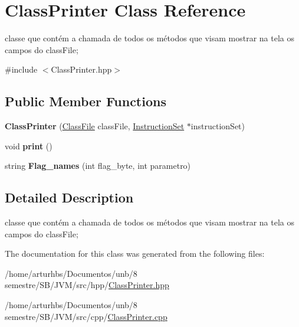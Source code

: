 \hypertarget{classClassPrinter}{}\section{Class\+Printer Class Reference}
\label{classClassPrinter}


classe que contém a chamada de todos os métodos que visam mostrar na tela os campos do class\+File;  




{\ttfamily \#include $<$Class\+Printer.\+hpp$>$}

\subsection*{Public Member Functions}
\begin{DoxyCompactItemize}
\item 
{\bfseries Class\+Printer} (\hyperlink{classClassFile}{Class\+File} class\+File, \hyperlink{classInstructionSet}{Instruction\+Set} $\ast$instruction\+Set)\hypertarget{classClassPrinter_ae6f4be2efe9a9e3e6056304330dc7430}{}\label{classClassPrinter_ae6f4be2efe9a9e3e6056304330dc7430}

\item 
void {\bfseries print} ()\hypertarget{classClassPrinter_a8871ec5a8e14410486d1aa1fa93323eb}{}\label{classClassPrinter_a8871ec5a8e14410486d1aa1fa93323eb}

\item 
string {\bfseries Flag\+\_\+names} (int flag\+\_\+byte, int parametro)\hypertarget{classClassPrinter_a9883cb947ce417ffe130175a93d9fd32}{}\label{classClassPrinter_a9883cb947ce417ffe130175a93d9fd32}

\end{DoxyCompactItemize}


\subsection{Detailed Description}
classe que contém a chamada de todos os métodos que visam mostrar na tela os campos do class\+File; 

The documentation for this class was generated from the following files\+:\begin{DoxyCompactItemize}
\item 
/home/arturhbs/\+Documentos/unb/8 semestre/\+S\+B/\+J\+V\+M/src/hpp/\hyperlink{ClassPrinter_8hpp}{Class\+Printer.\+hpp}\item 
/home/arturhbs/\+Documentos/unb/8 semestre/\+S\+B/\+J\+V\+M/src/cpp/\hyperlink{ClassPrinter_8cpp}{Class\+Printer.\+cpp}\end{DoxyCompactItemize}
